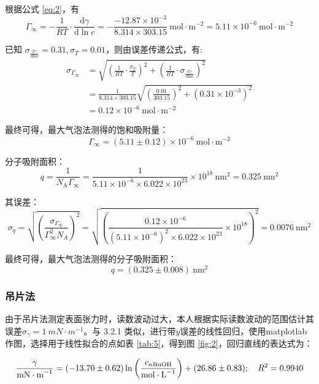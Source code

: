 根据公式 \eqref{eq:2}，有
$$
\Gamma_{\infty}=-\frac{1}{R T} \cdot \frac{\mathrm{d} \gamma}{\mathrm{d} \ln c}=-\frac{-12.87 \times 10^{-3}}{8.314 \times 303.15} \mathrm{~mol} \cdot \mathrm{m}^{-2}=5.11 \times 10^{-6} \mathrm{~mol} \cdot \mathrm{m}^{-2}
$$

已知 $\sigma_{\frac{\mathrm{d} \gamma}{\mathrm{dln} c}}=0.31, \sigma_T=0.01$，则由误差传递公式，有:
$$
\begin{aligned}
\sigma_{\Gamma_{\infty}} & =\sqrt{\left(\frac{1}{R T} \cdot \frac{\sigma_T}{T}\right)^2+\left(\frac{1}{R T} \cdot \sigma_{\frac{\mathrm{d} \gamma}{\mathrm{dln} c}}\right)^2} \\
& =\frac{1}{8.314 \times 303.15} \sqrt{\left(\frac{0.01}{303.15}\right)^2+\left(0.31 \times 10^{-3}\right)^2} \\
& =0.12 \times 10^{-6} \mathrm{~mol} \cdot \mathrm{m}^{-2}
\end{aligned}
$$

最终可得，最大气泡法测得的饱和吸附量：
$$
\Gamma_{\infty}=(5.11 \pm 0.12) \times 10^{-6} \mathrm{~mol} \cdot \mathrm{m}^{-2}
$$

分子吸附面积：
$$
q = \frac{1}{N_{\mathrm{A}}\Gamma_{\infty}} = \frac{1}{5.11 \times 10^{-6} \times 6.022 \times 10^{23}} \times 10^{18} \mathrm{~nm}^2=0.325 \mathrm{~nm}^2
$$

其误差：
$$
\sigma_q=\sqrt{\left(\frac{\sigma_{\Gamma_{\infty}}}{\Gamma_{\infty}^2 N_A}\right)^2}=\sqrt{\left(\frac{0.12 \times 10^{-6}}{\left(5.11 \times 10^{-6}\right)^2 \times 6.022 \times 10^{23}} \times 10^{18}\right)^2}=0.0076 \mathrm{~nm}^2
$$

最终可得，最大气泡法测得的分子吸附面积：
$$
q = (0.325\pm 0.008) \mathrm{~nm}^2
$$

\subsubsection{吊片法}

由于吊片法测定表面张力时，读数波动过大，本人根据实际读数波动的范围估计其误差$\sigma_\gamma = \SI{1}{mN\cdot m^{-1}}$。与 3.2.1 类似，进行带$y$误差的线性回归，使用matplotlab作图，选择用于线性拟合的点如表 \ref{tab:5}，得到图 \ref{fig:2}，回归直线的表达式为：

\begin{equation*}
    \frac{\gamma}{\si{mN\cdot m^{-1}}} = (-13.70 \pm 0.62)\ln\left(\frac{ c_{n\ce{BuOH}}}{\si{mol\cdot L^{-1}}}\right) + (26.86 \pm 0.83);\quad R^2 = 0.9940
\end{equation*}

